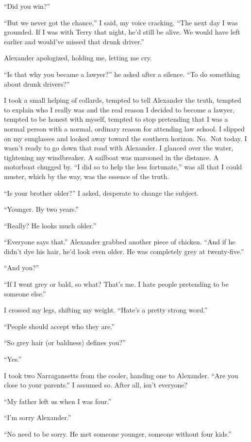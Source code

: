 ``Did you win?''

``But we never got the chance,'' I said, my voice cracking. ``The next
day I was grounded. If I was with Terry that night, he'd still be alive.
We would have left earlier and would've missed that drunk driver.''

Alexander apologized, holding me, letting me cry.

``Is that why you became a lawyer?'' he asked after a silence. ``To do
something about drunk drivers?''

I took a small helping of collards, tempted to tell Alexander the truth,
tempted to explain who I really was and the real reason I decided to
become a lawyer, tempted to be honest with myself, tempted to stop
pretending that I was a normal person with a normal, ordinary reason for
attending law school. I slipped on my sunglasses and looked away toward
the southern horizon. No.~Not today. I wasn't ready to go down that road
with Alexander. I glanced over the water, tightening my windbreaker. A
sailboat was marooned in the distance. A motorboat chugged by. ``I did
so to help the less fortunate,'' was all that I could muster, which by
the way, was the essence of the truth.

``Is your brother older?'' I asked, desperate to change the subject.

``Younger. By two years.''

``Really? He looks much older.''

``Everyone says that.'' Alexander grabbed another piece of chicken.
``And if he didn't dye his hair, he'd look even older. He was completely
grey at twenty-five.''

``And you?''

``If I went grey or bald, so what? That's me. I hate people pretending
to be someone else.''

I crossed my legs, shifting my weight. ``Hate's a pretty strong word.''

``People should accept who they are.''

``So grey hair (or baldness) defines you?''

``Yes.''

I took two Narragansetts from the cooler, handing one to Alexander.
``Are you close to your parents.'' I assumed so. After all, isn't
everyone?

``My father left us when I was four.''

``I'm sorry Alexander.''

``No need to be sorry. He met someone younger, someone without four
kids.''

